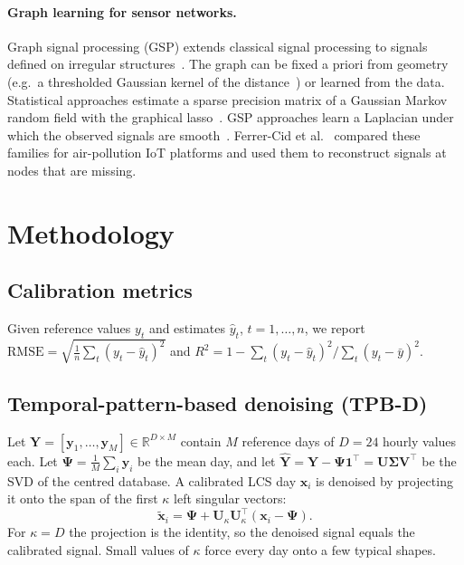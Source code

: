 \documentclass[11pt,a4paper]{article}
\begin{document}
\paragraph{Graph learning for sensor networks.} Graph signal processing (GSP) extends classical signal processing to signals defined on irregular structures~\cite{shuman2013,stankovic2019}. The graph can be fixed a priori from geometry (e.g.\ a thresholded Gaussian kernel of the distance~\cite{shuman2013}) or learned from the data. Statistical approaches estimate a sparse precision matrix of a Gaussian Markov random field with the graphical lasso~\cite{friedman2008}. GSP approaches learn a Laplacian under which the observed signals are smooth~\cite{dong2016,kalofolias2016}. Ferrer-Cid et al.~\cite{ferrercid2021} compared these families for air-pollution IoT platforms and used them to reconstruct signals at nodes that are missing.

\section{Methodology}\label{sec:methods}
\subsection{Calibration metrics}
Given reference values $y_t$ and estimates $\hat y_t$, $t=1,\dots,n$, we report
$\mathrm{RMSE}=\sqrt{\tfrac1n\sum_t(y_t-\hat y_t)^2}$ and
$R^2=1-\sum_t(y_t-\hat y_t)^2/\sum_t(y_t-\bar y)^2$.

\subsection{Temporal-pattern-based denoising (TPB-D)}
Let $\mathbf Y=[\mathbf y_1,\dots,\mathbf y_M]\in\mathbb R^{D\times M}$ contain $M$ reference days of $D=24$ hourly values each. Let $\boldsymbol\Psi=\frac1M\sum_i\mathbf y_i$ be the mean day, and let $\hat{\mathbf Y}=\mathbf Y-\boldsymbol\Psi\mathbf 1^\top=\mathbf U\boldsymbol\Sigma\mathbf V^\top$ be the SVD of the centred database. A calibrated LCS day $\mathbf x_i$ is denoised by projecting it onto the span of the first $\kappa$ left singular vectors:
\begin{equation}
  \tilde{\mathbf x}_i=\boldsymbol\Psi+\mathbf U_\kappa\mathbf U_\kappa^\top(\mathbf x_i-\boldsymbol\Psi).
  \label{eq:tpbd}
\end{equation}
For $\kappa=D$ the projection is the identity, so the denoised signal equals the calibrated signal. Small values of $\kappa$ force every day onto a few typical shapes.
\end{document}

